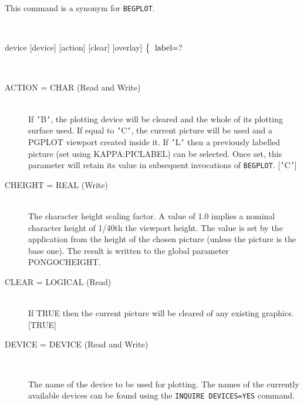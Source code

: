 \documentclass[twoside,11pt]{article}
\newcommand{\htmlref}[2]{#1}
\renewcommand{\_}{\texttt{\symbol{95}}}
\newcommand{\cnam}[1]{{\tt #1}}
\newcommand{\iref} [1]{\htmlref{#1}{#1}}
\newcommand{\sstusage}[1]{\item[Usage:] \mbox{}
\\[1.3ex]{\raggedright \ssttt #1}}
\newcommand{\sstparameters}[1]{
   \item[Parameters:] \mbox{} \\
   \vspace{-3.5ex}
   \begin{description}
      #1
   \end{description}
}
\newcommand{\sstsubsection}[1]{ \item[{#1}] \mbox{} \\}
\newcommand{\sstusage}[1]{\item[Usage:]
      \begin{description}
         {\ssttt #1}
      \end{description}
      \\
   }
\newcommand{\sstparameters}[1]{
      \item[Parameters:] \\
      \begin{description}
         #1
      \end{description}
      \\
   }
\newcommand{\sstsubsection}[1]{\item[{#1}]}
\begin{document}
\begin{sloppypar}
{{      This command is a synonym for \cnam{\iref{BEGPLOT}}.
   }
   \sstusage {
      device [device] [action] [clear] [overlay]
        \newline\hspace*{1.5em}
        $\left\{ {\begin{tabular}{l}
                                      label=? \\
                  \end{tabular} }
        \right.$
        \newline\hspace*{1.9em}
        \makebox[0mm][c]{\small action}
   }
   \sstparameters{
      \sstsubsection{
         ACTION = \_CHAR (Read and Write)
      }{
         If {\tt '}B{\tt '}, the plotting device will be cleared and the whole of
         its plotting surface used. If equal to {\tt '}C{\tt '}, the current picture
         will be used and a PGPLOT viewport created inside it. If {\tt '}L{\tt '}
         then a previously labelled picture (set using KAPPA:PICLABEL)
         can be selected. Once set, this parameter will retain its value
         in subsequent invocations of \cnam{\iref{BEGPLOT}}.
         [{\tt '}C{\tt '}]
      }
      \sstsubsection{
         CHEIGHT = \_REAL (Write)
      }{
         The character height scaling factor. A value of 1.0 implies a
         nominal character height of 1/40th the viewport height. The
         value is set by the application from the height of the chosen
         picture (unless the picture is the base one). The result is
         written to the global parameter PONGO\_CHEIGHT.
      }
      \sstsubsection{
         CLEAR = \_LOGICAL (Read)
      }{
         If TRUE then the current picture will be cleared of any
         existing graphics.
         [TRUE]
      }
      \sstsubsection{
         DEVICE = DEVICE (Read and Write)
      }{
         The name of the device to be used for plotting.  The names of
         the currently available devices can be found using the
         \cnam{\iref{INQUIRE} DEVICES=YES} command.

}}}
\end{sloppypar}
\end{document}

